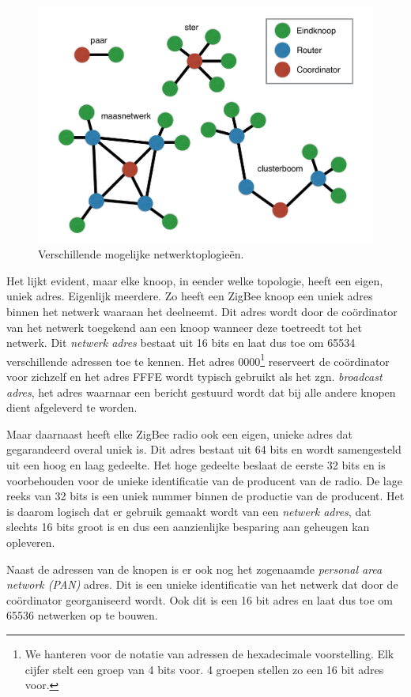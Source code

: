 \begin{figure}
  \centering
  \includegraphics[width=0.7\linewidth]{resources/topology.pdf}
  \caption{Verschillende mogelijke netwerktoplogie\"en.}
  \label{fig:topologie}
\end{figure}

Het lijkt evident, maar elke knoop, in eender welke topologie, heeft een eigen,
uniek adres. Eigenlijk meerdere. Zo heeft een ZigBee knoop een uniek adres
binnen het netwerk waaraan het deelneemt. Dit adres wordt door de co\"ordinator
van het netwerk toegekend aan een knoop wanneer deze toetreedt tot het netwerk.
Dit \emph{netwerk adres} bestaat uit 16 bits en laat dus toe om 65534
verschillende adressen toe te kennen. Het adres 0000\footnote{We hanteren voor
de notatie van adressen de hexadecimale voorstelling. Elk cijfer stelt een
groep van 4 bits voor. 4 groepen stellen zo een 16 bit adres voor.} reserveert
de co\"ordinator voor zichzelf en het adres FFFE wordt typisch gebruikt als het
zgn. \emph{broadcast adres}, het adres waarnaar een bericht gestuurd wordt dat
bij alle andere knopen dient afgeleverd te worden.

Maar daarnaast heeft elke ZigBee radio ook een eigen, unieke adres dat
gegarandeerd overal uniek is. Dit adres bestaat uit 64 bits en wordt
samengesteld uit een hoog en laag gedeelte. Het hoge gedeelte beslaat de eerste
32 bits en is voorbehouden voor de unieke identificatie van de producent van de
radio. De lage reeks van 32 bits is een uniek nummer binnen de productie van de
producent. Het is daarom logisch dat er gebruik gemaakt wordt van een
\emph{netwerk adres}, dat slechts 16 bits groot is en dus een aanzienlijke
besparing aan geheugen kan opleveren.

Naast de adressen van de knopen is er ook nog het zogenaamde \emph{personal
area network (PAN)} adres. Dit is een unieke identificatie van het netwerk dat
door de co\"ordinator georganiseerd wordt. Ook dit is een 16 bit adres en laat
dus toe om 65536 netwerken op te bouwen.

